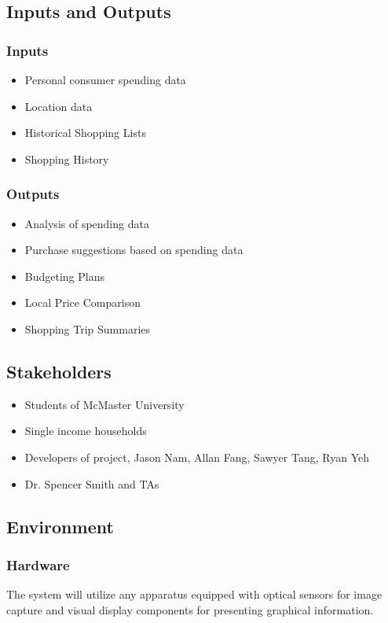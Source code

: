 \documentclass{article}
\begin{document}
\subsection{Inputs and Outputs}

\subsubsection{Inputs}
    \begin{itemize}
        \item Personal consumer spending data
        \item Location data
        \item Historical Shopping Lists
        \item Shopping History
    \end{itemize}

\subsubsection{Outputs}
    \begin{itemize}
        \item Analysis of spending data
        \item Purchase suggestions based on spending data
        \item Budgeting Plans
        \item Local Price Comparison
        \item Shopping Trip Summaries
    \end{itemize}

\subsection{Stakeholders}

\begin{itemize}
    \item Students of McMaster University
    \item Single income households
    \item Developers of project, Jason Nam, Allan Fang, Sawyer Tang, Ryan Yeh
    \item Dr. Spencer Smith and TAs
\end{itemize}

\subsection{Environment}

\subsubsection{Hardware} 
The system will utilize any apparatus equipped with optical sensors for image capture and visual display components for presenting graphical information.
\end{document}
